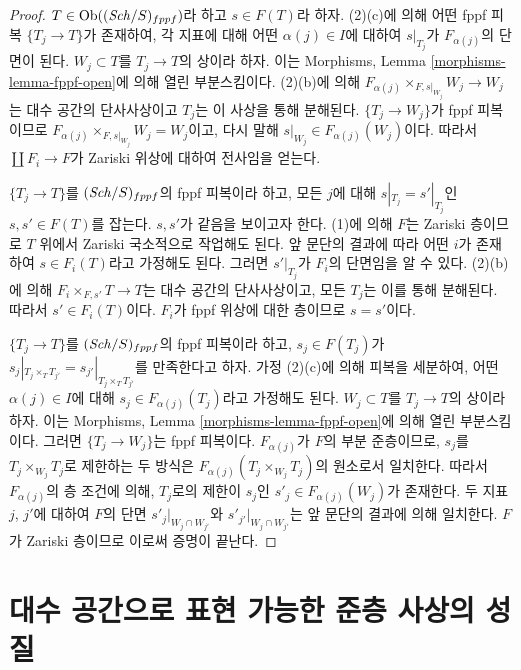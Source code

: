 \begin{proof}
$T \in \mathop{\mathrm{Ob}}\nolimits((\mathit{Sch}/S)_{fppf})$라 하고 $s \in F(T)$라 하자. (2)(c)에 의해
어떤 fppf 피복 $\{T_j \to T\}$가 존재하여, 각 지표에 대해
어떤 $\alpha(j) \in I$에 대하여 $s|_{T_j}$가 $F_{\alpha(j)}$의
단면이 된다. $W_j \subset T$를 $T_j \to T$의 상이라 하자.
이는 Morphisms, Lemma \ref{morphisms-lemma-fppf-open}에 의해 열린
부분스킴이다. (2)(b)에 의해
$F_{\alpha(j)} \times_{F, s|_{W_j}} W_j \to W_j$는 대수 공간의
단사사상이고 $T_j$는 이 사상을 통해 분해된다. $\{T_j \to W_j\}$가
fppf 피복이므로
$F_{\alpha(j)} \times_{F, s|_{W_j}} W_j = W_j$이고, 다시 말해
$s|_{W_j} \in F_{\alpha(j)}(W_j)$이다. 따라서
$\coprod F_i \to F$가 Zariski 위상에 대하여 전사임을 얻는다.

\medskip\noindent
$\{T_j \to T\}$를 $(\mathit{Sch}/S)_{fppf}$의 fppf 피복이라 하고,
모든 $j$에 대해 $s|_{T_j} = s'|_{T_j}$인 $s, s' \in F(T)$를 잡는다.
$s, s'$가 같음을 보이고자 한다. (1)에 의해 $F$는 Zariski 층이므로
$T$ 위에서 Zariski 국소적으로 작업해도 된다. 앞 문단의 결과에 따라
어떤 $i$가 존재하여 $s \in F_i(T)$라고 가정해도 된다. 그러면
$s'|_{T_j}$가 $F_i$의 단면임을 알 수 있다. (2)(b)에 의해
$F_{i} \times_{F, s'} T \to T$는 대수 공간의 단사사상이고, 모든
$T_j$는 이를 통해 분해된다. 따라서 $s' \in F_i(T)$이다.
$F_i$가 fppf 위상에 대한 층이므로 $s = s'$이다.

\medskip\noindent
$\{T_j \to T\}$를 $(\mathit{Sch}/S)_{fppf}$의 fppf 피복이라 하고,
$s_j \in F(T_j)$가
$s_j|_{T_j \times_T T_{j'}} = s_{j'}|_{T_j \times_T T_{j'}}$를
만족한다고 하자. 가정 (2)(c)에 의해 피복을
세분하여, 어떤 $\alpha(j) \in I$에 대해
$s_j \in F_{\alpha(j)}(T_j)$라고 가정해도 된다. $W_j \subset T$를
$T_j \to T$의 상이라 하자.
이는 Morphisms, Lemma \ref{morphisms-lemma-fppf-open}에 의해 열린
부분스킴이다. 그러면 $\{T_j \to W_j\}$는 fppf 피복이다.
$F_{\alpha(j)}$가 $F$의 부분 준층이므로, $s_j$를
$T_j \times_{W_j} T_j$로 제한하는 두 방식은
$F_{\alpha(j)}(T_j \times_{W_j} T_j)$의 원소로서 일치한다.
따라서 $F_{\alpha(j)}$의 층 조건에 의해, $T_j$로의 제한이 $s_j$인
$s'_j \in F_{\alpha(j)}(W_j)$가 존재한다. 두 지표 $j$, $j'$에 대하여
$F$의 단면 $s'_j|_{W_j \cap W_{j'}}$와
$s'_{j'}|_{W_j \cap W_{j'}}$는 앞 문단의 결과에 의해 일치한다.
$F$가 Zariski 층이므로 이로써 증명이 끝난다.
\end{proof}



\section{대수 공간으로 표현 가능한 준층 사상의 성질}
\label{section-representable-by-spaces-properties}

